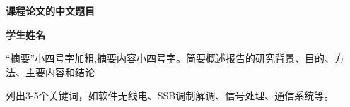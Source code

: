 \thispagestyle{empty} %
\begin{center}
    {\songti{}\textbf{课程论文的中文题目} \par}
    {\songti{}\textbf{学生姓名} \par}
\end{center}

\begin{hutb_abstract}
    “摘要”小四号字加粗,摘要内容小四号字。简要概述报告的研究背景、目的、方法、主要内容和结论
\end{hutb_abstract}

\begin{hutb_keywords}
    列出3-5个关键词，如软件无线电、SSB调制解调、信号处理、通信系统等。
\end{hutb_keywords}